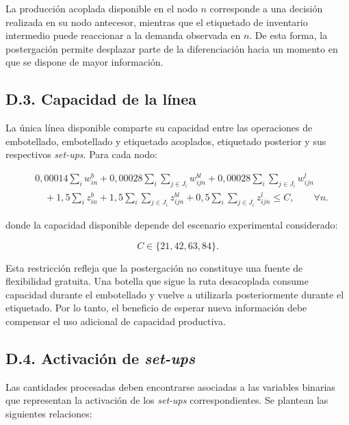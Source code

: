La producción acoplada disponible en el nodo $n$ corresponde a una decisión
realizada en su nodo antecesor, mientras que el etiquetado de inventario
intermedio puede reaccionar a la demanda observada en $n$. De esta forma, la
postergación permite desplazar parte de la diferenciación hacia un momento en
que se dispone de mayor información.


\subsection*{D.3. Capacidad de la línea}

La única línea disponible comparte su capacidad entre las operaciones de
embotellado, embotellado y etiquetado acoplados, etiquetado posterior y sus
respectivos \textit{set-ups}. Para cada nodo:

\begin{equation}
\begin{aligned}
    &0{,}00014\sum_i w^{b}_{in}
    +
    0{,}00028\sum_i\sum_{j\in J_i} w^{bl}_{ijn}
    +
    0{,}00028\sum_i\sum_{j\in J_i} w^{l}_{ijn}
    \\
    &\quad+
    1{,}5\sum_i z^{b}_{in}
    +
    1{,}5\sum_i\sum_{j\in J_i} z^{bl}_{ijn}
    +
    0{,}5\sum_i\sum_{j\in J_i} z^{l}_{ijn}
    \leq C,
    \qquad \forall n.
\end{aligned}
\label{eq:anexoD-capacidad}
\end{equation}

donde la capacidad disponible depende del escenario experimental considerado:

\begin{equation}
    C \in \{21,42,63,84\}.
    \label{eq:anexoD-niveles-capacidad}
\end{equation}

Esta restricción refleja que la postergación no constituye una fuente de
flexibilidad gratuita. Una botella que sigue la ruta desacoplada consume
capacidad durante el embotellado y vuelve a utilizarla posteriormente durante
el etiquetado. Por lo tanto, el beneficio de esperar nueva información debe
compensar el uso adicional de capacidad productiva.


\subsection*{D.4. Activación de \textit{set-ups}}

Las cantidades procesadas deben encontrarse asociadas a las variables binarias
que representan la activación de los \textit{set-ups} correspondientes. Se
plantean las siguientes relaciones:

